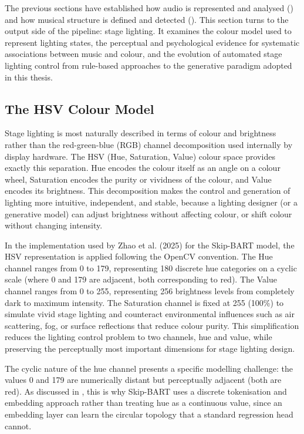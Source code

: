 The previous sections have established how audio is represented and analysed () and how musical structure is defined and detected (). This section turns to the output side of the pipeline: stage lighting. It examines the colour model used to represent lighting states, the perceptual and psychological evidence for systematic associations between music and colour, and the evolution of automated stage lighting control from rule-based approaches to the generative paradigm adopted in this thesis.

\subsection{The HSV Colour Model}

Stage lighting is most naturally described in terms of colour and brightness rather than the red-green-blue (RGB) channel decomposition used internally by display hardware. The HSV (Hue, Saturation, Value) colour space provides exactly this separation. Hue encodes the colour itself as an angle on a colour wheel, Saturation encodes the purity or vividness of the colour, and Value encodes its brightness. This decomposition makes the control and generation of lighting more intuitive, independent, and stable, because a lighting designer (or a generative model) can adjust brightness without affecting colour, or shift colour without changing intensity.\cite{zhao2025automatic} 

In the implementation used by Zhao et al. (2025) for the Skip-BART model, the HSV representation is applied following the OpenCV convention. The Hue channel ranges from 0 to 179, representing 180 discrete hue categories on a cyclic scale (where 0 and 179 are adjacent, both corresponding to red). The Value channel ranges from 0 to 255, representing 256 brightness levels from completely dark to maximum intensity. The Saturation channel is fixed at 255 (100\%) to simulate vivid stage lighting and counteract environmental influences such as air scattering, fog, or surface reflections that reduce colour purity. This simplification reduces the lighting control problem to two channels, hue and value, while preserving the perceptually most important dimensions for stage lighting design.\cite{zhao2025automatic} 

The cyclic nature of the hue channel presents a specific modelling challenge: the values 0 and 179 are numerically distant but perceptually adjacent (both are red). As discussed in , this is why Skip-BART uses a discrete tokenisation and embedding approach rather than treating hue as a continuous value, since an embedding layer can learn the circular topology that a standard regression head cannot.\cite{zhao2025automatic} 

